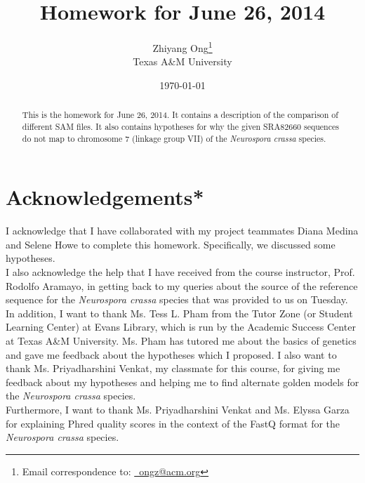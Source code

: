 \documentclass[letter,12pt]{article}
\begin{document}
\title{Homework for June 26, 2014}
\date{\today}
\author{Zhiyang Ong\thanks{Email correspondence to: \href{mailto:ongz@acm.org}{\Email\ ongz@acm.org}}\\
	Texas A\&M University
}
\maketitle


\begin{abstract} 
This is the homework for June 26, 2014. It contains a description of the comparison of different SAM files. It also contains hypotheses for why the given SRA82660 sequences do not map to chromosome 7 (linkage group VII) of the {\it Neurospora crassa} species.
\end{abstract}




\section{Acknowledgements*}
\label{sec:Acknowledgement*}

I acknowledge that I have collaborated with my project teammates Diana Medina and Selene Howe to complete this homework. Specifically, we discussed some hypotheses. \\

I also acknowledge the help that I have received from the course instructor, Prof. Rodolfo Aramayo, in getting back to my queries about the source of the reference sequence for the {\it Neurospora crassa} species that was provided to us on Tuesday. \\

In addition, I want to thank Ms. Tess L. Pham from the Tutor Zone (or Student Learning Center) at Evans Library, which is run by the Academic Success Center at Texas A\&M University. Ms. Pham has tutored me about the basics of genetics and gave me feedback about the hypotheses which I proposed. I also want to thank Ms. Priyadharshini Venkat, my classmate for this course, for giving me feedback about my hypotheses and helping me to find alternate golden models for the {\it Neurospora crassa} species. \\

Furthermore, I want to thank Ms. Priyadharshini Venkat and Ms. Elyssa Garza for explaining Phred quality scores in the context of the FastQ format for the {\it Neurospora crassa} species.
\end{document}
